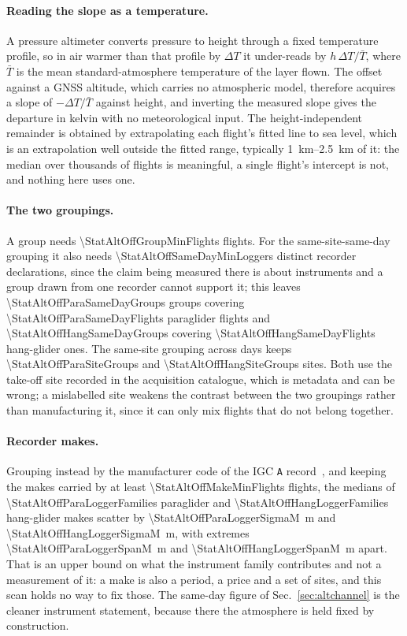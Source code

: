 \begin{revblock}
\paragraph{Reading the slope as a temperature.} A pressure altimeter converts pressure to
height through a fixed temperature profile, so in air warmer than that profile by
$\Delta T$ it under-reads by $h\,\Delta T/\bar{T}$, where $\bar{T}$ is the mean
standard-atmosphere temperature of the layer flown. The offset against a GNSS altitude,
which carries no atmospheric model, therefore acquires a slope of $-\Delta T/\bar{T}$
against height, and inverting the measured slope gives the departure in kelvin with no
meteorological input. The height-independent remainder is obtained by extrapolating each
flight's fitted line to sea level, which is an extrapolation well outside the fitted
range, typically \SIrange{1}{2.5}{\kilo\metre} of it: the median over thousands of
flights is meaningful, a single flight's intercept is not, and nothing here uses one.

\paragraph{The two groupings.} A group needs \num{\StatAltOffGroupMinFlights} flights.
For the same-site-same-day grouping it also needs
\num{\StatAltOffSameDayMinLoggers} distinct recorder declarations, since the claim being
measured there is about instruments and a group drawn from one recorder cannot support
it; this leaves \num{\StatAltOffParaSameDayGroups} groups covering
\num{\StatAltOffParaSameDayFlights} paraglider flights and
\num{\StatAltOffHangSameDayGroups} covering \num{\StatAltOffHangSameDayFlights}
hang-glider ones. The same-site grouping across days keeps
\num{\StatAltOffParaSiteGroups} and \num{\StatAltOffHangSiteGroups} sites. Both use the
take-off site recorded in the acquisition catalogue, which is metadata and can be wrong;
a mislabelled site weakens the contrast between the two groupings rather than
manufacturing it, since it can only mix flights that do not belong together.

\paragraph{Recorder makes.} Grouping instead by the manufacturer code of the IGC
\texttt{A} record~\cite{fai_igc_spec}, and keeping the makes carried by at least \num{\StatAltOffMakeMinFlights}
flights, the medians of \num{\StatAltOffParaLoggerFamilies} paraglider and
\num{\StatAltOffHangLoggerFamilies} hang-glider makes scatter by
\SI{\StatAltOffParaLoggerSigmaM}{\metre} and \SI{\StatAltOffHangLoggerSigmaM}{\metre},
with extremes \SI{\StatAltOffParaLoggerSpanM}{\metre} and
\SI{\StatAltOffHangLoggerSpanM}{\metre} apart. That is an upper bound on what the
instrument family contributes and not a measurement of it: a make is also a period, a
price and a set of sites, and this scan holds no way to fix those. The same-day figure of
Sec.~\ref{sec:altchannel} is the cleaner instrument statement, because there the
atmosphere is held fixed by construction.


\end{revblock}
